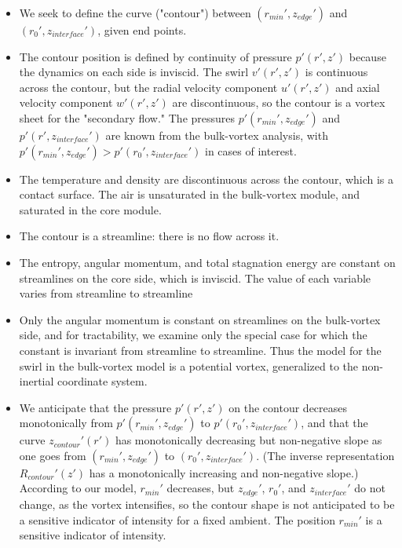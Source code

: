 \documentclass[preprint, prX]{revtex4}
\begin{document}
\begin{itemize}

\item We seek to define the curve ("contour") between $(r_{min}', z_{edge}')$ and $(r_0', z_{interface}')$, given end points.

\item The contour position is defined by continuity of pressure $p'(r',z')$ because the dynamics on each side is inviscid. The swirl $v'(r',z')$ is continuous across the contour, but the radial velocity component $u'(r',z')$ and axial velocity component $w'(r',z')$ are discontinuous, so the contour is a vortex sheet for the "secondary flow." The pressures $p'(r_{min}',z_{edge}')$ and $p'(r',z_{interface}')$ are known from the bulk-vortex analysis, with $p'(r_{min}',z_{edge}') > p'(r_0',z_{interface}')$ in cases of interest.

\item The temperature and density are discontinuous across the contour, which is a contact surface. The air is unsaturated in the bulk-vortex module, and saturated in the core module.

\item The contour is a streamline: there is no flow across it.

\item The entropy, angular momentum, and total stagnation energy are constant on streamlines on the core side, which is inviscid. The value of each variable varies from streamline to streamline

\item Only the angular momentum is constant on streamlines on the bulk-vortex side, and for tractability, we examine only the special case for which the constant is invariant from streamline to streamline. Thus the model for the swirl in the bulk-vortex model is a potential vortex, generalized to the non-inertial coordinate system.

\item We anticipate that the pressure $p'(r',z')$ on the contour decreases monotonically from $p'(r_{min}',z_{edge}')$ to $p'(r_0',z_{interface}')$, and that the curve $z_{contour}'(r')$ has monotonically decreasing but non-negative slope as one goes from $(r_{min}', z_{edge}')$ to $(r_0', z_{interface}')$. (The inverse representation $R_{contour}'(z')$ has a monotonically increasing and non-negative slope.) According to our model, $r_{min}'$ decreases, but $z_{edge}'$, $r_0'$, and $z_{interface}'$ do not change, as the vortex intensifies, so the contour shape is not anticipated to be a sensitive indicator of intensity for a fixed ambient. The position $r_{min}'$ is a sensitive indicator of intensity.
\end{itemize}
\end{document}
